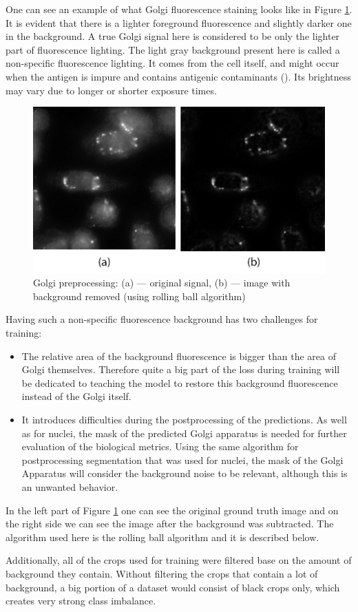 One can see an example of what Golgi fluorescence staining looks like in Figure \ref{fig:golgi-enhancement}. It is evident that there is a lighter foreground fluorescence and slightly darker one in the background. A true Golgi signal here is considered to be only the lighter part of fluorescence lighting. The light gray background present here is called a non-specific fluorescence lighting. It comes from the cell itself, and might occur when the antigen is impure and contains antigenic contaminants (\cite{Borek_1984}). Its brightness may vary due to longer or shorter exposure times. 

\begin{figure}[htb]
	\begin{center}
		\includegraphics[width=0.5\linewidth]{bilder/enhancement.png}
		\caption[Golgi preprocessing]%
		{Golgi preprocessing: (a) --- original signal, (b) --- image with background removed (using rolling ball algorithm)}\label{fig:golgi-enhancement}
	\end{center}
\end{figure}

Having such a non-specific fluorescence background has two challenges for training:
\begin{itemize}
    \item The relative area of the background fluorescence is bigger than the area of Golgi themselves. Therefore quite a big part of the loss during training will be dedicated to teaching the model to restore this background fluorescence instead of the Golgi itself.
    \item It introduces difficulties during the postprocessing of the predictions. As well as for nuclei, the mask of the predicted Golgi apparatus is needed for further evaluation of the biological metrics. Using the same algorithm for postprocessing segmentation that was used for nuclei, the mask of the Golgi Apparatus will consider the background noise to be relevant, although this is an unwanted behavior.
\end{itemize}

In the left part of Figure \ref{fig:golgi-enhancement} one can see the original ground truth image and on the right side we can see the image after the background was subtracted. The algorithm used here is the rolling ball algorithm and it is described below.

Additionally, all of the crops used for training were filtered base on the amount of background they contain. Without filtering the crops that contain a lot of background, a big portion of a dataset would consist of black crops only, which creates very strong class imbalance.
